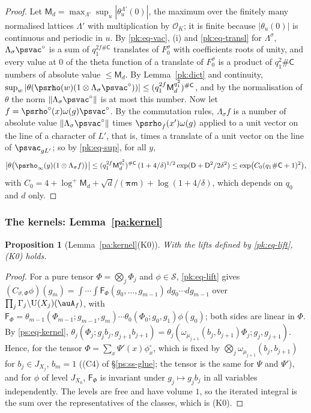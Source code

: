 \documentclass[10pt]{amsart}
\newtheorem{proposition}[theorem]{Proposition}
\theoremstyle{definition}
\theoremstyle{remark}
\providecommand{\auO}{\mathcal O}
\providecommand{\auS}{\mathcal S}
\providecommand{\auU}{\mathrm U}
\begin{document}
\begin{proof}
Let $\mathsf M_d=\max_{\Lambda'}\sup_u|\theta^{\Lambda'}_u(0)|$, the maximum over the finitely many
normalised lattices $\Lambda'$ with multiplication by $\auO_K$; it is finite because
$|\theta_u(0)|$ is continuous and periodic in $u$. By \eqref{pk:eq-vac}, (i) and
\eqref{pk:eq-transl} for $\Lambda^\sigma$, $\Lambda_\sigma\psvac^\circ$ is a sum of $q_1^{2f\#
\mathsf C}$ translates of $F_0^\sigma$ with coefficients roots of unity, and every value at $0$ of
the theta function of a translate of $F_0^\sigma$ is a product of $q_1^2\#\mathsf C$ numbers of
absolute value $\le\mathsf M_d$. By Lemma~\ref{pk:dict} and continuity,
$\sup_w|\theta(\psrho(w)(1\otimes\Lambda_\sigma\psvac^\circ))|\le(q_1^{2f}\mathsf M_d^{q_1^2})^{\#
\mathsf C}$, and by the normalisation of $\theta$ the norm $\|\Lambda_\sigma\psvac^\circ\|$ is at
most this number. Now let $f=\psrho^\circ(x)\omega(g)\psvac^\circ$. By the commutation rules,
$\Lambda_\sigma f$ is a number of absolute value $\|\Lambda_\sigma\psvac^\circ\|$ times
$\psrho_f(x')\omega(g)$ applied to a unit vector on the line of a character of $L'$, that is,
times a translate of a unit vector on the line of $\psvac_{gL'}$; so by \eqref{pk:eq-sup}, for
all $y$,
\[
\bigl|\theta\bigl(\psrho_\infty(y)(1\otimes\Lambda_\sigma f)\bigr)\bigr|\le(q_1^{2f}\mathsf
M_d^{q_1^2})^{\#\mathsf C}\,(1+4/\delta)^{1/2}\exp(\mathsf D+\mathsf D^2/2\delta^2)\le\exp\bigl(C_0
(q_1\#\mathsf C+1)^2\bigr),
\]
with $C_0=4+\log^+\mathsf M_d+\sqrt d/(\boldsymbol\pi\mathsf m)+\log(1+4/\delta)$, which depends
on $q_0$ and $d$ only.
\end{proof}

\subsubsection{The kernels: Lemma~\ref{pa:kernel}}\label{pk:ss-kernel}

\begin{proposition}[Lemma~\ref{pa:kernel}(K0)]\label{pk:K0}
With the lifts defined by \eqref{pk:eq-lift}, {\rm(K0)} holds.
\end{proposition}
\begin{proof}
For a pure tensor $\Phi=\bigotimes_j\Phi_j$ and $\phi\in\auS$, \eqref{pk:eq-lift} gives
$(C_{\vartheta,\Phi}\phi)(g_m)=\int\cdots\int\mathsf F_\Phi(g_0,\dots,g_{m-1})\,dg_0\cdots dg_{m-1}$
over $\prod_j\Gamma_j\backslash\auU(X_j)(\auA_f)$, with $\mathsf F_\Phi=\theta_{m-1}(\Phi_{m-1};
g_{m-1},g_m)\cdots\theta_0(\Phi_0;g_0,g_1)\phi(g_0)$; both sides are linear in $\Phi$. By
\eqref{ps:eq-kernel}, $\theta_j(\Phi_j;g_jb_j,g_{j+1}b_{j+1})=\theta_j(\omega_{\mu_{j+1}}(b_j,
b_{j+1})\Phi_j;g_j,g_{j+1})$. Hence, for the tensor $\Phi=\sum_x\Psi'(x)\phi^\circ_x$, which is
fixed by $\bigotimes_j\omega_{\mu_{j+1}}(b_j,b_{j+1})$ for $b_j\in J_{X_j}$, $b_m=1$ ((C4) of
\S\ref{ps:ss-glue}; the tensor is the same for $\Psi$ and $\Psi'$), and for $\phi$ of level
$J_{X_0}$, $\mathsf F_\Phi$ is invariant under $g_j\mapsto g_jb_j$ in all variables independently.
The levels are free and have volume $1$, so the iterated integral is the sum over the
representatives of the classes, which is (K0).
\end{proof}
\end{document}
